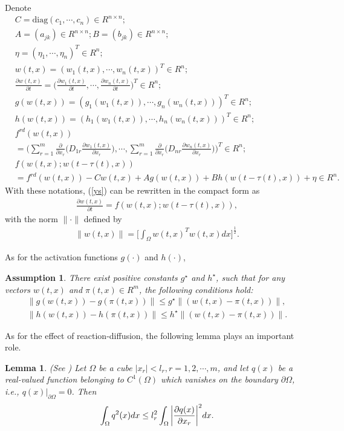 \documentclass[review]{elsarticle}
\newtheorem{lem}{Lemma}
\newtheorem{asu}{Assumption}
\begin{document}
Denote
\begin{align*}
&C=\mathrm{diag}(c_1,\cdots,c_n)\in R^{n\times n};\\
&A=(a_{jk})\in R^{n\times n}; B=(b_{jk})\in R^{n\times n};\\
&\eta=(\eta_1,\cdots,\eta_n)^T\in R^n;\\
&w(t,x)=(w_1(t,x),\cdots,w_n(t,x))^T\in R^n;\\
&\frac{\partial{w}(t,x)}{\partial{t}}=\bigg(\frac{\partial{w}_1(t,x)}{\partial{t}},\cdots,
\frac{\partial{w}_n(t,x)}{\partial{t}}\bigg)^T\in R^n;\\
&g(w(t,x))=(g_1(w_1(t,x)),\cdots,g_n(w_n(t,x)))^T\in R^n;\\
&h(w(t,x))=(h_1(w_1(t,x)),\cdots,h_n(w_n(t,x)))^T\in
R^n;\\
&f^{rd}(w(t,x))\\
&=\Bigg(\sum\limits_{r=1}^m\frac{\partial{}}{\partial{x}_r}
\bigg(D_{1r}\frac{\partial{w}_1(t,x)}{\partial{x}_r}\bigg),\cdots,
\sum\limits_{r=1}^m\frac{\partial{}}{\partial{x}_r}
\bigg(D_{nr}\frac{\partial{w}_n(t,x)}{\partial{x}_r}\bigg)
\Bigg)^T\in R^n;\\
&f(w(t,x);w(t-\tau(t),x))\\
&=f^{rd}(w(t,x))-Cw(t,x)+Ag(w(t,x))+Bh(w(t-\tau(t),x))+\eta\in R^n.
\end{align*}
With these notations, (\ref{ys}) can be rewritten in the compact
form as
\begin{align}\label{ys2}
\frac{\partial{w}(t,x)}{\partial{t}}=f(w(t,x);w(t-\tau(t),x)),
\end{align}
with the norm $\|\cdot\|$ defined by
\begin{align}
\|w(t,x)\|=\bigg[\int_{\Omega}w(t,x)^Tw(t,x)dx\bigg]^{\frac{1}{2}}.
\end{align}

As for the activation functions $g(\cdot)$ and $h(\cdot)$,
\begin{asu}\label{add}
There exist positive constants $g^{\star}$ and $h^{\star}$, such that for any vectors $w(t,x)$ and $\pi(t,x)\in R^m$, the following conditions hold:
\begin{align*}
\|g(w(t,x))-g(\pi(t,x))\|\le
g^{\star}\|(w(t,x)-\pi(t,x))\|,\\
\|h(w(t,x))-h(\pi(t,x))\|\le h^{\star}\|(w(t,x)-\pi(t,x))\|.
\end{align*}
\end{asu}

As for the effect of reaction-diffusion, the following lemma plays an important role.
\begin{lem}\label{use} (See \cite{Lu2008})
Let $\Omega$ be a cube $|x_r|<l_r, r=1,2,\cdots,m$, and let $q(x)$ be a real-valued function belonging to $C^1(\Omega)$ which vanishes on the boundary $\partial{\Omega}$, i.e., $q(x)|_{\partial{\Omega}}=0$. Then
\begin{align*}
\int_{\Omega}q^2(x)dx\le l_r^2\int_{\Omega}\bigg{|}\frac{\partial{q(x)}}{\partial{x_r}}\bigg{|}^2dx.
\end{align*}
\end{lem}
\end{document}
